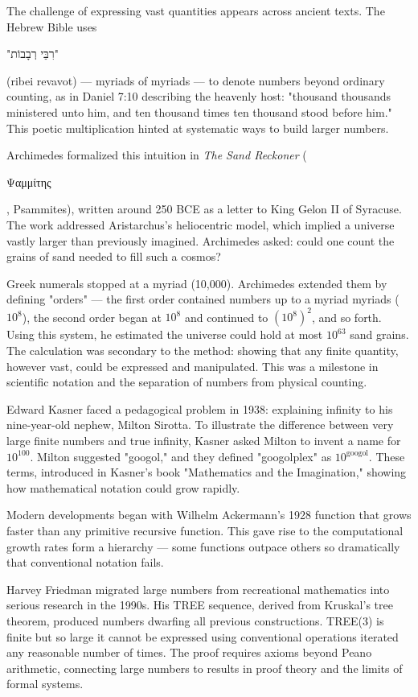 
\begin{historical}
    The challenge of expressing vast quantities appears across ancient texts. The Hebrew Bible uses \begin{hebrew}"רִבֵּי רְבָבוֹת"\end{hebrew} (ribei revavot) — myriads of myriads — to denote numbers beyond ordinary counting, as in Daniel 7:10 describing the heavenly host: "thousand thousands ministered unto him, and ten thousand times ten thousand stood before him." This poetic multiplication hinted at systematic ways to build larger numbers.

Archimedes formalized this intuition in \textit{The Sand Reckoner} (\begin{greek}Ψαμμίτης\end{greek}, Psammites), written around 250 BCE as a letter to King Gelon II of Syracuse. The work addressed Aristarchus's heliocentric model, which implied a universe vastly larger than previously imagined. Archimedes asked: could one count the grains of sand needed to fill such a cosmos? 

Greek numerals stopped at a myriad (10,000). Archimedes extended them by defining "orders" — the first order contained numbers up to a myriad myriads ($10^8$), the second order began at $10^8$ and continued to $(10^8)^2$, and so forth. Using this system, he estimated the universe could hold at most $10^{63}$ sand grains. The calculation was secondary to the method: showing that any finite quantity, however vast, could be expressed and manipulated. This was a milestone in scientific notation and the separation of numbers from physical counting.

Edward Kasner faced a pedagogical problem in 1938: explaining infinity to his nine-year-old nephew, Milton Sirotta. To illustrate the difference between very large finite numbers and true infinity, Kasner asked Milton to invent a name for $10^{100}$. Milton suggested "googol," and they defined "googolplex" as $10^{\text{googol}}$. These terms, introduced in Kasner's book "Mathematics and the Imagination," showing how mathematical notation could grow rapidly.

Modern developments began with Wilhelm Ackermann's 1928 function that grows faster than any primitive recursive function. This gave rise to the computational growth rates form a hierarchy — some functions outpace others so dramatically that conventional notation fails.

Harvey Friedman migrated large numbers from recreational mathematics into serious research in the 1990s. His TREE sequence, derived from Kruskal's tree theorem, produced numbers dwarfing all previous constructions. TREE(3) is finite but so large it cannot be expressed using conventional operations iterated any reasonable number of times. The proof requires axioms beyond Peano arithmetic, connecting large numbers to results in proof theory and the limits of formal systems.
\end{historical}